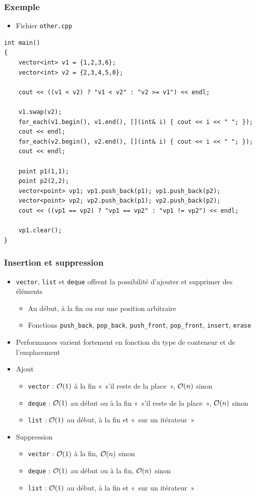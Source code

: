 \begin{frame}[containsverbatim]
\frametitle{Exemple}
\begin{itemize}
\item Fichier \texttt{other.cpp}
\end{itemize}
\begin{lstlisting}
int main()
{
	vector<int> v1 = {1,2,3,6};
	vector<int> v2 = {2,3,4,5,0};

	cout << ((v1 < v2) ? "v1 < v2" : "v2 >= v1") << endl;

	v1.swap(v2);
	for_each(v1.begin(), v1.end(), [](int& i) { cout << i << " "; }); 
	cout << endl;
	for_each(v2.begin(), v2.end(), [](int& i) { cout << i << " "; }); 
	cout << endl;

	point p1(1,1);
	point p2(2,2);
	vector<point> vp1; vp1.push_back(p1); vp1.push_back(p2);
	vector<point> vp2; vp2.push_back(p1); vp2.push_back(p2);	
	cout << ((vp1 == vp2) ? "vp1 == vp2" : "vp1 != vp2") << endl;

	vp1.clear();
}
\end{lstlisting}
\end{frame}

\begin{frame}
\frametitle{Insertion et suppression}
\begin{itemize}[<+->]
\item \texttt{vector}, \texttt{list} et \texttt{deque} offrent la possibilité d'ajouter et supprimer des éléments
	\begin{itemize}
	\item Au début, à la fin ou sur une position arbitraire
	\item Fonctions \texttt{push\_back}, \texttt{pop\_back}, \texttt{push\_front}, \texttt{pop\_front}, \texttt{insert}, \texttt{erase}
	\end{itemize}
\item Performances varient fortement en fonction du type de conteneur et de l'emplacement
\item Ajout
	\begin{itemize}
	\item \texttt{vector} : ${\mathcal{O}}(1)$ à la fin «~s'il reste de la place~», ${\mathcal{O}}(n)$ sinon
	\item \texttt{deque} : ${\mathcal{O}}(1)$ au début ou à la fin «~s'il reste de la place~», ${\mathcal{O}}(n)$ sinon
	\item \texttt{list} : ${\mathcal{O}}(1)$ au début, à la fin et «~sur un itérateur~»
	\end{itemize}
\item Suppression
	\begin{itemize}
	\item \texttt{vector} : ${\mathcal{O}}(1)$ à la fin, ${\mathcal{O}}(n)$ sinon
	\item \texttt{deque} : ${\mathcal{O}}(1)$ au début ou à la fin, ${\mathcal{O}}(n)$ sinon
	\item \texttt{list} : ${\mathcal{O}}(1)$ au début, à la fin et «~sur un itérateur~»
	\end{itemize}
\end{itemize}
\end{frame}

